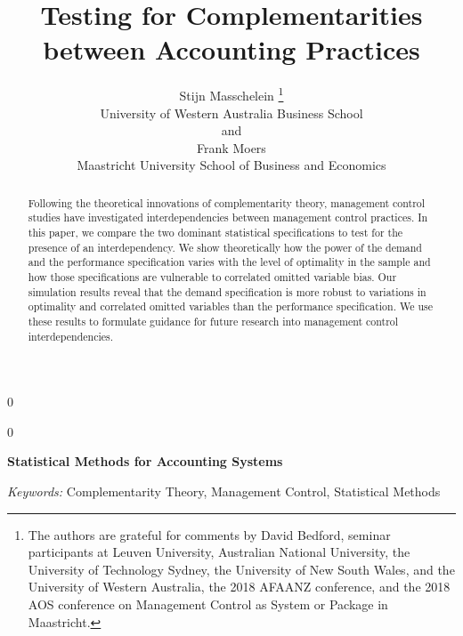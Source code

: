 \documentclass[12pt]{article}
\newcommand{\blind}{0}
\begin{document}
\def\spacingset#1{\renewcommand{\baselinestretch}%
{#1}\small\normalsize} \spacingset{1}


\blind
{
  \title{\bf Testing for Complementarities between Accounting Practices}

  \author{
        Stijn Masschelein \thanks{The authors are grateful for comments by David Bedford, seminar participants at Leuven University, Australian National University, the University of Technology Sydney, the University of New South Wales, and the University of Western Australia, the 2018 AFAANZ conference, and the 2018 AOS conference on Management Control as System or Package in Maastricht.} \\
    University of Western Australia Business School\\
     and \\     Frank Moers \\
    Maastricht University School of Business and Economics\\
      }
  \maketitle
} \fi

\blind
{
  \bigskip
  \bigskip
  \bigskip
  \begin{center}
    {\LARGE\bf Statistical Methods for Accounting Systems}
  \end{center}
  \medskip
} \fi

\bigskip
\begin{abstract}
Following the theoretical innovations of complementarity theory, management control studies have investigated  interdependencies between management control practices. In this paper, we compare the two dominant statistical specifications to test for the presence of an interdependency. We show theoretically how the power of the demand and the performance specification varies with the level of optimality in the sample and how those specifications are vulnerable to correlated omitted variable bias. Our simulation results reveal that the demand specification is more robust to variations in optimality and correlated omitted variables than the performance specification. We use these results to formulate guidance for future research into management control interdependencies.
\end{abstract}

\noindent%
{\it Keywords:} Complementarity Theory, Management Control, Statistical Methods
\vfill
\end{document}
